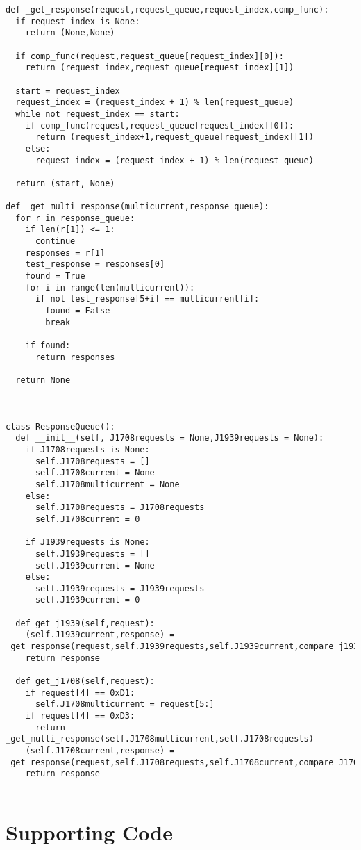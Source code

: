 \begin{appendices}
\begin{verbatim}
def _get_response(request,request_queue,request_index,comp_func):
  if request_index is None:
    return (None,None)

  if comp_func(request,request_queue[request_index][0]):
    return (request_index,request_queue[request_index][1])

  start = request_index
  request_index = (request_index + 1) % len(request_queue)
  while not request_index == start:
    if comp_func(request,request_queue[request_index][0]):
      return (request_index+1,request_queue[request_index][1])
    else:
      request_index = (request_index + 1) % len(request_queue)

  return (start, None)

def _get_multi_response(multicurrent,response_queue):
  for r in response_queue:
    if len(r[1]) <= 1:
      continue
    responses = r[1]
    test_response = responses[0]
    found = True
    for i in range(len(multicurrent)):
      if not test_response[5+i] == multicurrent[i]:
        found = False
        break

    if found:
      return responses

  return None


  
class ResponseQueue():
  def __init__(self, J1708requests = None,J1939requests = None):
    if J1708requests is None:
      self.J1708requests = []
      self.J1708current = None
      self.J1708multicurrent = None
    else:
      self.J1708requests = J1708requests
      self.J1708current = 0

    if J1939requests is None:
      self.J1939requests = []
      self.J1939current = None
    else:
      self.J1939requests = J1939requests
      self.J1939current = 0
  
  def get_j1939(self,request):
    (self.J1939current,response) = _get_response(request,self.J1939requests,self.J1939current,compare_j1939_msg)
    return response

  def get_j1708(self,request):
    if request[4] == 0xD1:
      self.J1708multicurrent = request[5:]
    if request[4] == 0xD3:
      return _get_multi_response(self.J1708multicurrent,self.J1708requests)
    (self.J1708current,response) = _get_response(request,self.J1708requests,self.J1708current,compare_J1708_msg)
    return response
      

\end{verbatim}
%

\section{Supporting Code}

\end{appendices}

